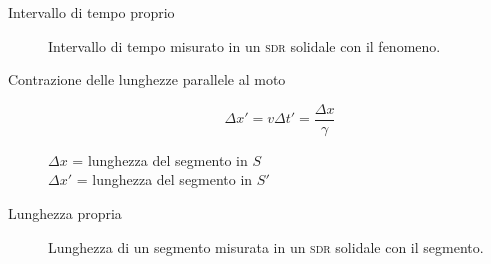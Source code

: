 \documentclass[a4paper,11pt,italian]{article}
\begin{document}
\begin{description}
  \item[Intervallo di tempo proprio]
  Intervallo di tempo misurato in un \textsc{sdr} solidale con il fenomeno.
  
  \item[Contrazione delle lunghezze parallele al moto] 
  \[ \Delta x' = v \Delta t' = \frac{\Delta x}{\gamma} \]
  \begin{multicols}{2}
  $ \Delta x $ = lunghezza del segmento in $ S $\\
  $ \Delta x' $ = lunghezza del segmento in $ S' $
  \end{multicols}
  
  \item[Lunghezza propria] Lunghezza di un segmento misurata in un \textsc{sdr} solidale con il segmento.
  
%   
%   

\end{description}
\end{document}
